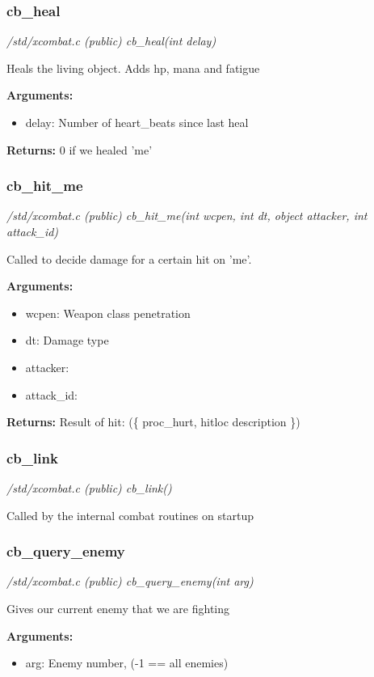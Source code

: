 \subsubsection{cb\_heal}

{\em /std/xcombat.c (public) cb\_heal(int delay)}

Heals the living object. Adds hp, mana and fatigue

{\bf Arguments:}
\begin{itemize}
\item      delay: Number of heart\_beats since last heal
\end{itemize}

{\bf Returns:}         0 if we healed 'me'


\subsubsection{cb\_hit\_me}

{\em /std/xcombat.c (public) cb\_hit\_me(int wcpen, int dt, object attacker, int attack\_id)}

Called to decide damage for a certain hit on 'me'.

{\bf Arguments:}
\begin{itemize}
\item     wcpen:    Weapon class penetration
\item dt:       Damage type
\item attacker: 
\item attack\_id:
\end{itemize}

{\bf Returns:}        Result of hit: (\{ proc\_hurt, hitloc description \})


\subsubsection{cb\_link}

{\em /std/xcombat.c (public) cb\_link()}

Called by the internal combat routines on startup


\subsubsection{cb\_query\_enemy}

{\em /std/xcombat.c (public) cb\_query\_enemy(int arg)}

Gives our current enemy that we are fighting

{\bf Arguments:}
\begin{itemize}
\item      arg: Enemy number, (-1 == all enemies)
\end{itemize}

